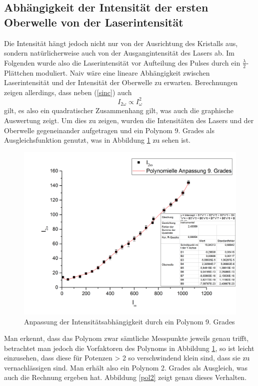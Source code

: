 \subsection{Abhängigkeit der Intensität der ersten Oberwelle von der Laserintensität}
Die Intensität hängt jedoch nicht nur von der Ausrichtung des Kristalls aus, sondern natürlicherweise auch von der Ausgangintensität des Lasers ab. Im Folgenden wurde also die Laserintensität vor Aufteilung des Pulses durch ein $\frac{\lambda}{2}$-Plättchen moduliert. \newline
Naiv wäre eine lineare Abhängigkeit zwischen Laserintensität und der Intensität der Oberwelle zu erwarten. Berechnungen zeigen allerdings, dass neben (\ref{sinc}) auch
\begin{equation}
I_{2\omega}\propto I_\omega^2
\end{equation}
gilt, es also ein quadratischer Zusammenhang gilt, was auch die graphische Auswertung zeigt. Um dies zu zeigen, wurden die Intensitäten des Lasers und der Oberwelle gegeneinander aufgetragen und ein Polynom 9. Grades als Ausgleichsfunktion genutzt, was in Abbildung \ref{pol9} zu sehen ist.
\begin{figure}[H]
	\begin{center}
		\includegraphics[scale=.5]{Bilder/IntPol9.png}
		\caption{Anpassung der Intensitätsabhängigkeit durch ein Polynom 9. Grades}
		\label{pol9}
	\end{center}
\end{figure}
Man erkennt, dass das Polynom zwar sämtliche Messpunkte jeweils genau trifft, betrachtet man jedoch die Vorfaktoren des Polynoms in Abbildung \ref{pol9}, so ist leicht einzusehen, dass diese für Potenzen > 2 so verschwindend klein sind, dass sie zu vernachlässigen sind. Man erhält also ein Polynom 2. Grades als Ausgleich, was auch die Rechnung ergeben hat. Abbildung \ref{pol2} zeigt genau dieses Verhalten.
